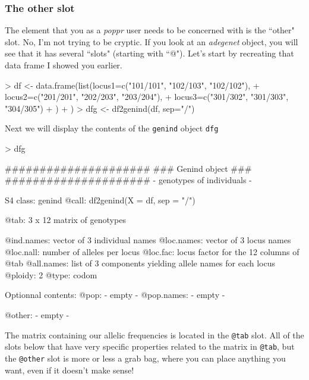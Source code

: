 \documentclass[letterpaper]{article}
\newcommand{\tab}{\hspace*{1em}}
\begin{document}
\subsubsection{The other slot}\label{intro:genind:other}

\tab\tab The element that you as a \textit{poppr} user needs to be concerned with is the ``other" slot. No, I'm not trying to be cryptic. If you look at an \textit{adegenet} object, you will see that it has several ``slots" (starting with ``@"). \cite{Jombart:2008} Let's start by recreating that data frame I showed you earlier.
\begin{Schunk}
\begin{Sinput}
> df <- data.frame(list(locus1=c("101/101", "102/103", "102/102"), 
+                       locus2=c("201/201", "202/203", "203/204"), 
+                       locus3=c("301/302", "301/303", "304/305")
+                       )
+                  )
> dfg <- df2genind(df, sep="/")
\end{Sinput}
\end{Schunk}
Next we will display the contents of the \texttt{genind} object \texttt{dfg}
\begin{Schunk}
\begin{Sinput}
> dfg
\end{Sinput}
\begin{Soutput}
   #####################
   ### Genind object ### 
   #####################
- genotypes of individuals - 

S4 class:  genind
@call: df2genind(X = df, sep = "/")

@tab:  3 x 12 matrix of genotypes

@ind.names: vector of  3 individual names
@loc.names: vector of  3 locus names
@loc.nall: number of alleles per locus
@loc.fac: locus factor for the  12 columns of @tab
@all.names: list of  3 components yielding allele names for each locus
@ploidy:  2
@type:  codom

Optionnal contents: 
@pop:  - empty -
@pop.names:  - empty -

@other: - empty -
\end{Soutput}
\end{Schunk}

The matrix containing our allelic frequencies is located in the \texttt{@tab} slot. All of the  slots below that have very specific properties related to the matrix in \texttt{@tab}, but the \texttt{@other} slot is more or less a grab bag, where you can place anything you want, even if it doesn't make sense!
\end{document}
